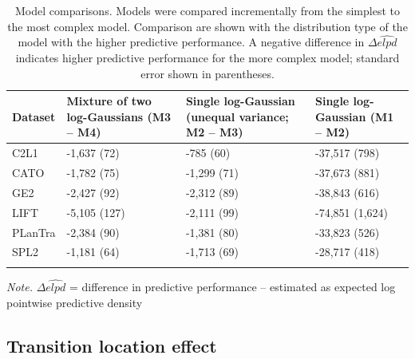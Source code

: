 \documentclass[
  man,floatsintext]{apa7}
\begin{document}
\begin{table}[tbp]

\begin{center}
\begin{threeparttable}

\caption{\label{tab:loos}Model comparisons. Models were compared incrementally from the simplest to the most complex model. Comparison are shown with the distribution type of the model with the higher predictive performance. A negative difference in $\Delta\widehat{elpd}$ indicates higher predictive performance for the more complex model; standard error shown in parentheses.}

\small{

\begin{tabular}{p{1.75cm}p{4cm}p{4.25cm}p{3.5cm}}
\toprule
Dataset & Mixture of two log-Gaussians (M3 -- M4) & Single log-Gaussian (unequal variance; M2 -- M3) & Single log-Gaussian (M1 -- M2)\\
\midrule
C2L1 & -1,637 (72) & -785 (60) & -37,517 (798)\\
CATO & -1,782 (75) & -1,299 (71) & -37,673 (881)\\
GE2 & -2,427 (92) & -2,312 (89) & -38,843 (616)\\
LIFT & -5,105 (127) & -2,111 (99) & -74,851 (1,624)\\
PLanTra & -2,384 (90) & -1,381 (80) & -33,823 (526)\\
SPL2 & -1,181 (64) & -1,713 (69) & -28,717 (418)\\
\bottomrule
\addlinespace
\end{tabular}

}

\begin{tablenotes}[para]
\normalsize{\textit{Note.} $\Delta\widehat{elpd}$ = difference in predictive performance -- estimated as expected log pointwise predictive density}
\end{tablenotes}

\end{threeparttable}
\end{center}

\end{table}

\hypertarget{transition-location-effect}{%
\subsection{Transition location effect}\label{transition-location-effect}}
\end{document}
